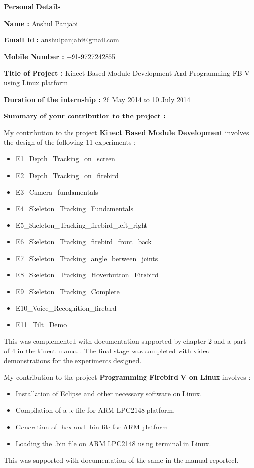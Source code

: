 \documentclass[20pt]{report}
\begin{document}
\hspace{2.5in}
\textbf{Personal Details}
\medskip

\textbf{Name : }
Anshul Panjabi
\medskip


\textbf{Email Id : }
anshulpanjabi@gmail.com
\medskip


\textbf{Mobile Number : }
+91-9727242865
\medskip


\textbf{Title of Project : }
Kinect Based Module Development And Programming FB-V using Linux platform
\medskip


\textbf{Duration of the internship : }
26 May 2014 to 10 July 2014
\medskip


\textbf{Summary of your contribution to the project : }

 My contribution to the project \textbf{Kinect Based Module Development} involves the design of the 
 following 11 experiments :
\begin{itemize}
\item E1\_Depth\_Tracking\_on\_screen
\item E2\_Depth\_Tracking\_on\_firebird
\item E3\_Camera\_fundamentals
\item E4\_Skeleton\_Tracking\_Fundamentals
\item E5\_Skeleton\_Tracking\_firebird\_left\_right
\item E6\_Skeleton\_Tracking\_firebird\_front\_back
\item E7\_Skeleton\_Tracking\_angle\_between\_joints
\item E8\_Skeleton\_Tracking\_Hoverbutton\_Firebird
\item E9\_Skeleton\_Tracking\_Complete
\item E10\_Voice\_Recognition\_firebird
\item E11\_Tilt\_Demo
\end{itemize}
 This was complemented with documentation supported by chapter 2 and a part of 4 in the kinect manual. The final stage was completed with video demonstrations for the experiments designed.
 
My contribution to the project \textbf{Programming Firebird V on Linux} involves :
\begin{itemize}
\item Installation of Eclipse and other necessary software on Linux.
\item Compilation of a .c file for ARM LPC2148 platform.
\item Generation of .hex and .bin file for ARM platform.
\item Loading the .bin file on ARM LPC2148 using terminal in Linux.
\end{itemize}
 This was supported with documentation of the same in the manual reportecl.
\medskip
\end{document}
